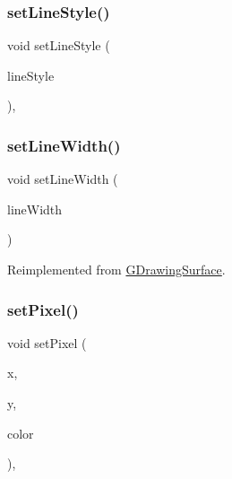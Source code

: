 \subsubsection{\texorpdfstring{set\+Line\+Style()}{setLineStyle()}}
{\footnotesize\ttfamily void set\+Line\+Style (\begin{DoxyParamCaption}\item[{\mbox{\hyperlink{classGObject_a86e0f5648542856159bb40775c854aa7}{G\+Object\+::\+Line\+Style}}}]{line\+Style }\end{DoxyParamCaption})\hspace{0.3cm}{\ttfamily [virtual]}, {\ttfamily [inherited]}}

\mbox{\label{classGForwardDrawingSurface_a22b7be843264ca79a9bb3851ce3368b9}} 
\subsubsection{\texorpdfstring{set\+Line\+Width()}{setLineWidth()}}
{\footnotesize\ttfamily void set\+Line\+Width (\begin{DoxyParamCaption}\item[{double}]{line\+Width }\end{DoxyParamCaption})\hspace{0.3cm}{\ttfamily [virtual]}}



Reimplemented from \mbox{\hyperlink{classGDrawingSurface_afd6a47c6ea6a1f85ca05a65ba3ff3477}{G\+Drawing\+Surface}}.

\mbox{\label{classGDrawingSurface_a09f9640e4ff7388dcfc391efd88d2415}} 
\subsubsection{\texorpdfstring{set\+Pixel()}{setPixel()}\hspace{0.1cm}{\footnotesize\ttfamily [1/3]}}
{\footnotesize\ttfamily void set\+Pixel (\begin{DoxyParamCaption}\item[{double}]{x,  }\item[{double}]{y,  }\item[{const std\+::string \&}]{color }\end{DoxyParamCaption})\hspace{0.3cm}{\ttfamily [virtual]}, {\ttfamily [inherited]}}

